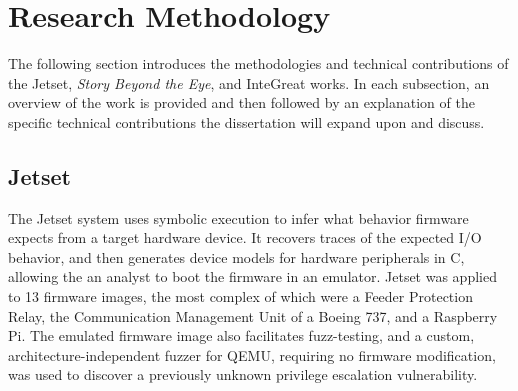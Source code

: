 \newenvironment{prettylist}{
	\begin{list}{
		\footnotesize\raisebox{0pt}{\small\ding{121}}
	}{
		\setlength\topsep{2pt plus 1pt minus 1pt}
		\setlength\leftmargin{2em}
		\setlength\rightmargin{0pt}
		\setlength\itemsep{1pt plus.1pt}
		\setlength\parskip{0pt}
		\setlength\parsep{0pt}
		\setlength\itemindent{0pt}
	}
}{
	\end{list}
}





\section{Research Methodology}
\label{sec:methods}

The following section introduces the methodologies and technical contributions of the Jetset, \emph{Story Beyond the Eye}, and InteGreat works.
In each subsection, an overview of the work is provided and then followed by an explanation of the specific technical contributions the dissertation will expand upon and discuss.

\subsection{Jetset}

The Jetset system uses symbolic execution to infer what behavior firmware expects from a target hardware device.
It recovers traces of the expected I/O behavior, and then generates device models for hardware peripherals in C, allowing the an analyst to boot the firmware in an emulator.
Jetset was applied to 13 firmware images, the most complex of which were a Feeder Protection Relay, the Communication Management Unit of a Boeing 737, and a Raspberry Pi.
The emulated firmware image also facilitates fuzz-testing, and a custom, architecture-independent fuzzer for QEMU, requiring no firmware modification, was used to discover a previously unknown privilege escalation vulnerability.

